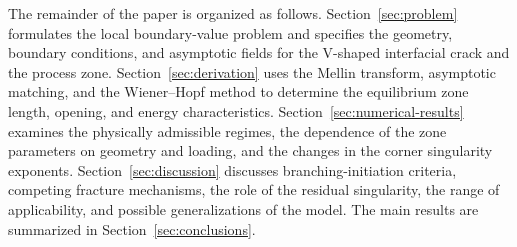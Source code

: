 The remainder of the paper is organized as follows. Section~\ref{sec:problem}
formulates the local boundary-value problem and specifies the geometry,
boundary conditions, and asymptotic fields for the V-shaped interfacial crack
and the process zone. Section~\ref{sec:derivation} uses the Mellin transform,
asymptotic matching, and the Wiener--Hopf method to determine the equilibrium
zone length, opening, and energy characteristics. Section~\ref{sec:numerical-results}
examines the physically admissible regimes, the dependence of the zone
parameters on geometry and loading, and the changes in the corner singularity
exponents. Section~\ref{sec:discussion} discusses branching-initiation
criteria, competing fracture mechanisms, the role of the residual
singularity, the range of applicability, and possible generalizations of the
model. The main results are summarized in Section~\ref{sec:conclusions}.
